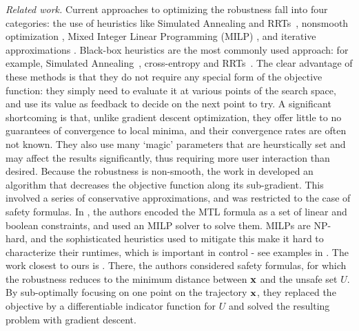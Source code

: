 \textit{Related work.}
Current approaches to optimizing the robustness fall into four categories: 
the use of heuristics like Simulated Annealing and RRTs~\cite{NghiemSFIGP10hscc,AbbasF_HybridSA12,SankaranarayananF2012hscc,Dreossi15_RRTFalsification,zutshi_trajectory_2013,Deshmukh15_IterativeApproaches}, 
nonsmooth optimization \cite{AbbasF13acc}, 
Mixed Integer Linear Programming (MILP) \cite{Raman14_MPCSTL}, 
and iterative approximations \cite{AbbasATVA11_LinFalsification,Abbas14_MTLDescent}.
Black-box heuristics are the most commonly used approach: for example, Simulated Annealing~\cite{NghiemSFIGP10hscc}, cross-entropy \cite{SankaranarayananF2012hscc} and RRTs~\cite{Dreossi15_RRTFalsification}.
The clear advantage of these methods is that they do not require any special form of the objective function: they simply need to evaluate it at various points of the search space, and use its value as feedback to decide on the next point to try.
A significant shortcoming is that, unlike gradient descent optimization, they offer little to no guarantees of convergence to local minima, and their convergence rates are often not known. 
They also use many `magic' parameters that are heurstically set and may affect the results significantly, thus requiring more user interaction than desired.
Because the robustness is non-smooth, the work in \cite{AbbasF13acc} developed an algorithm that decreases the objective function along its sub-gradient. 
This involved a series of conservative approximations, and was restricted to the case of safety formulas.
In \cite{Raman14_MPCSTL}, the authors encoded the MTL formula as a set of linear and boolean constraints, and used an MILP solver to solve them.
MILPs are NP-hard, and the sophisticated heuristics used to mitigate this make it hard to characterize their runtimes, which is important in control - see examples in \cite{Raman14_MPCSTL}.
The work closest to ours is \cite{AbbasATVA11_LinFalsification,Abbas14_MTLDescent}.
There, the authors considered safety formulas, for which the robustness reduces to the minimum distance between $\mathbf{x}$ and the unsafe set $U$.
By sub-optimally focusing on one point on the trajectory $\mathbf{x}$, they replaced the objective by a differentiable indicator function for $U$ and solved the resulting problem with gradient descent.


